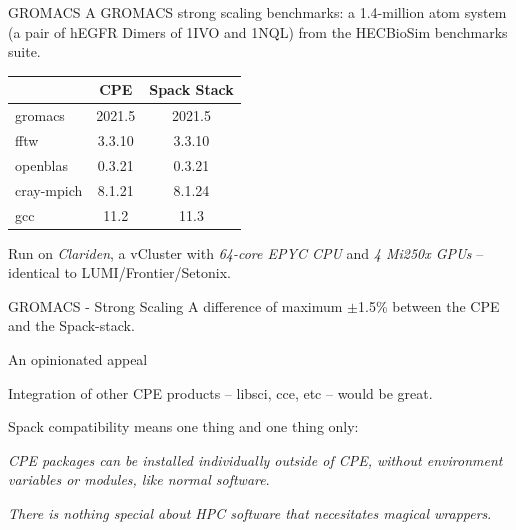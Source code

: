 \documentclass[aspectratio=43]{beamer}
\begin{document}
\begin{frame}[fragile]{GROMACS}
    A GROMACS strong scaling benchmarks: a 1.4-million atom system (a pair of hEGFR Dimers of 1IVO and 1NQL) from the HECBioSim benchmarks suite.
\begin{center}
    \begin{tabular}{|l |c  c| }
        \cline{2-3}
\multicolumn{1}{c|}{} & CPE   & Spack Stack \\
        \hline
        gromacs       & 2021.5   & 2021.5   \\
        fftw          & 3.3.10   & 3.3.10   \\
        openblas      & 0.3.21   & 0.3.21   \\
        cray-mpich    & 8.1.21   & 8.1.24   \\
        gcc           & 11.2     & 11.3     \\
          \hline
    \end{tabular}
\end{center}

    Run on \emph{Clariden}, a vCluster with \emph{64-core EPYC CPU} and  \emph{4 Mi250x GPUs} -- identical to LUMI/Frontier/Setonix.
\end{frame}

\begin{frame}[fragile]{GROMACS - Strong Scaling}
    A difference of maximum $\pm$1.5\% between the CPE and the Spack-stack.
    \begin{center}
        
    \end{center}
\end{frame}


\begin{frame}[fragile]{An opinionated appeal}
    \begin{center}
    Integration of other CPE products -- libsci, cce, etc -- would be great.

    \vspace{20pt}

    Spack compatibility means one thing and one thing only:

    \vspace{20pt}

    \emph{CPE packages can be installed individually outside of CPE, without environment variables or modules, like normal software}.

    \vspace{20pt}

    \emph{There is nothing special about HPC software that necesitates magical wrappers}.
    \end{center}
\end{frame}
\end{document}
